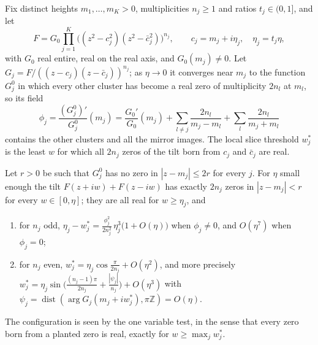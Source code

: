 Fix distinct heights $m_1,\dots,m_K>0$, multiplicities $n_j\ge1$ and ratios $t_j\in(0,1]$, and let
\[
F=G_0\prod_{j=1}^K\big((z^2-c_j^2)(z^2-\bar c_j^2)\big)^{n_j},\qquad c_j=m_j+i\eta_j,\quad \eta_j=t_j\eta,
\]
with $G_0$ real entire, real on the real axis, and $G_0(m_j)\ne0$. Let $G_j=F/((z-c_j)(z-\bar c_j))^{n_j}$; as $\eta\to0$ it converges near $m_j$ to the function $G_j^0$ in which every other cluster has become a real zero of multiplicity $2n_l$ at $m_l$, so its field
\[
\phi_j=\frac{(G_j^0)'}{G_j^0}(m_j)=\frac{G_0'}{G_0}(m_j)+\sum_{l\ne j}\frac{2n_l}{m_j-m_l}+\sum_{l}\frac{2n_l}{m_j+m_l}
\]
contains the other clusters and all the mirror images. The local slice threshold $w_j^*$ is the least $w$ for which all $2n_j$ zeros of the tilt born from $c_j$ and $\bar c_j$ are real.

\begin{theorem}\label{cm:thm:several}
Let $r>0$ be such that $G_j^0$ has no zero in $|z-m_j|\le2r$ for every $j$. For $\eta$ small enough the tilt $F(z+iw)+F(z-iw)$ has exactly $2n_j$ zeros in $|z-m_j|<r$ for every $w\in[0,\eta]$; they are all real for $w\ge\eta_j$, and
\begin{enumerate}
\item for $n_j$ odd, $\eta_j-w_j^*=\frac{\phi_j^2}{2n_j^2}\,\eta_j^3\big(1+O(\eta)\big)$ when $\phi_j\ne0$, and $O(\eta^7)$ when $\phi_j=0$;
\item for $n_j$ even, $w_j^*=\eta_j\cos\frac\pi{2n_j}+O(\eta^2)$, and more precisely $w_j^*=\eta_j\sin\big(\frac{(n_j-1)\pi}{2n_j}+\frac{|\psi_j|}{n_j}\big)+O(\eta^3)$ with $\psi_j=\operatorname{dist}(\arg G_j(m_j+iw_j^*),\pi\mathbb Z)=O(\eta)$.
\end{enumerate}
The configuration is seen by the one variable test, in the sense that every zero born from a planted zero is real, exactly for $w\ge\max_jw_j^*$.
\end{theorem}

